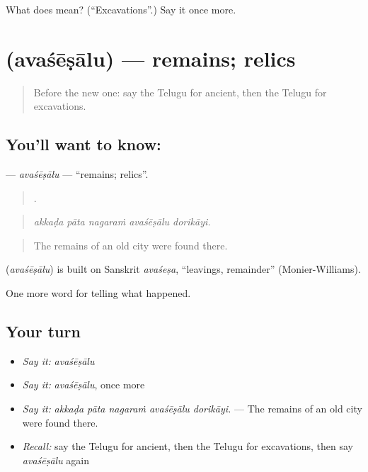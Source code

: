 \begin{tcolorbox}[breakable,colback=teal!4,colframe=teal!35!black,title={Before you move on}]
What does  mean? (\textquotedblleft{}Excavations\textquotedblright{}.) Say it once more.
\end{tcolorbox}
\section[\texorpdfstring{\te{అవశేషాలు} (avaśēṣālu)}{అవశేషాలు (avaśēṣālu)}]{ (avaśēṣālu) — remains; relics}

\label{lesson:TE-C367-avasesalu}



\begin{quote}
Before the new one: say the Telugu for ancient, then the Telugu for excavations.
\end{quote}

\subsection*{You'll want to know: }
\textbf{} — \emph{avaśēṣālu} — \textquotedblleft{}remains; relics\textquotedblright{}.

\begin{quote}
    .
\end{quote}

\begin{quote}
\emph{akkaḍa pāta nagaraṁ avaśēṣālu dorikāyi.}
\end{quote}

\begin{quote}
The remains of an old city were found there.
\end{quote}

\begin{cousinweb}
\textbf{} (\emph{avaśēṣālu}) is built on Sanskrit \emph{avaśeṣa}, \textquotedblleft{}leavings, remainder\textquotedblright{} (Monier-Williams).
\end{cousinweb}

\begin{grammarlens}[title={What you've built}]
One more word for telling what happened.
\end{grammarlens}

\subsection*{Your turn}
\begin{itemize}
\raggedright
  \item \emph{Say it:} \emph{avaśēṣālu}
  \item \emph{Say it:} \emph{avaśēṣālu}, once more
  \item \emph{Say it:} \emph{akkaḍa pāta nagaraṁ avaśēṣālu dorikāyi.} — The remains of an old city were found there.
  \item \emph{Recall:} say the Telugu for ancient, then the Telugu for excavations, then say \emph{avaśēṣālu} again
\end{itemize}

